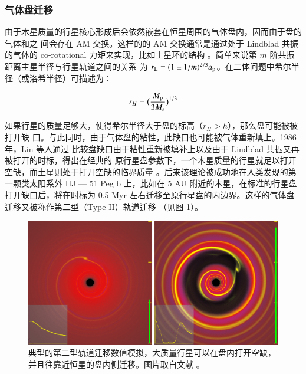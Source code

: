 \subsubsection{气体盘迁移} \label{sec:diskmig}

由于木星质量的行星核心形成后会依然嵌套在恒星周围的气体盘内，因而由于盘的气体和之
间会存在 AM 交换。这样的的 AM 交换通常是通过处于 Lindblad 共振的气体的 co-rotational 
力矩来实现\cite{Binney1987,GoldreichTremaine1979}，比如土星环的结构
\cite{GoldreichTremaine1980}。简单来说第 $m$ 阶共振距离主星半径与行星轨道之间的关系
为 $r_\mathrm{L} = (1\pm 1/m)^{2/3} a_\mathrm{p}$。在二体问题中希尔半径（或洛希半径）可描述为：

\begin{equation} \label{eq:hillradius}
r_H = \big( \frac{M_\mathrm{p}}{3M_\mathrm{s}} \big) ^{1/3}
\end{equation} 

如果行星的质量足够大，使得希尔半径大于盘的标高（$r_H > h$），那么盘可能被被打开缺
口。与此同时，由于气体盘的粘性，此缺口也可能被气体重新填上。1986 年，Lin 等人通过
比较盘缺口由于粘性重新被填补上以及由于 Lindblad 共振又再被打开的时标，得出在经典的
原行星盘参数下，一个木星质量的行星就足以打开空缺，而土星则处于打开空缺的临界质量
\cite{Lin1986,Ward1997}。后来该理论被成功地在人类发现的第一颗类太阳系外 HJ --- 51 Peg
 b 上\cite{Lin1996}，比如在 5 AU 附近的木星，在标准的行星盘打开缺口后，将在时标为 0.5 
 Myr 左右迁移至原行星盘的内边界。这样的气体盘迁移又被称作第二型（Type II）轨道迁移
 （见图 \ref{fig:diskmig}）。

\begin{figure}[t]
\centering
\includegraphics[width=1.0\textwidth]{figures/chapter4/fig3_diskmig.eps}
\caption[典型的第二型轨道迁移数值模拟，大质量行星可以在盘内打开空缺，并且往靠近恒星的盘内侧迁移。图片版权 Armitage\/Rice。]{典型的第二型轨道迁移数值模拟，大质量行星可以在盘内打开空缺，并且往靠近恒星的盘内侧迁移。图片取自文献 。}
\label{fig:diskmig}
\end{figure}


